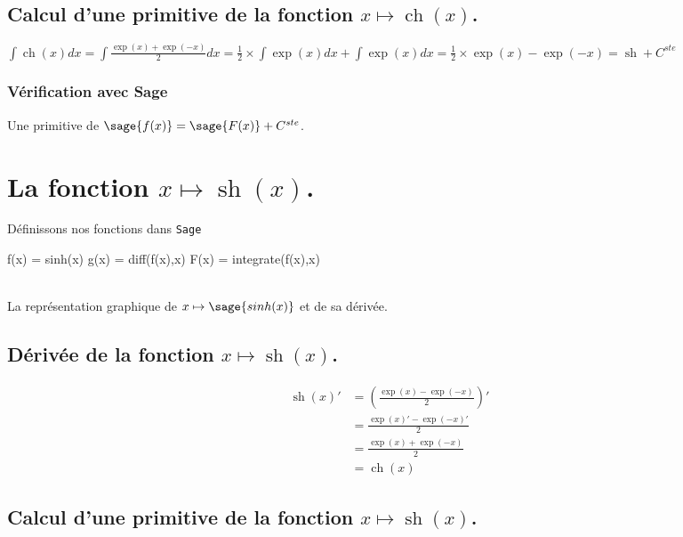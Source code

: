 \documentclass[a4paper,landscape,17pt]{extreport} %
\renewcommand{\sinh}{\mathop{\mathrm{sh}}}
\renewcommand{\cosh}{\mathop{\mathrm{ch}}}
\begin{document}
\subsection{Calcul d'une primitive de la fonction  $x \mapsto \cosh(x)$.}

$\int \cosh(x) dx = \int \frac{\exp(x)+ \exp(-x)}{2} dx = \frac{1}{2} \times \int \exp(x) dx + \int \exp(x) dx = \frac{1}{2} \times \exp(x) - \exp(-x) = \sinh + C^{ste}$


\subsubsection{Vérification avec Sage}

Une primitive de $\sage{f(x)} = \sage{F(x)} + C^{ste}$.





\section{La fonction  $x \mapsto \sinh(x)$.}

Définissons nos fonctions dans {\texttt{Sage}}
\begin{sageblock}
    f(x) = sinh(x)
    g(x) = diff(f(x),x)
    F(x) = integrate(f(x),x)
\end{sageblock}



\begin{center}
 \\
La représentation graphique de $x \mapsto \sage{sinh(x)} $ et de sa dérivée. 
\end{center}


\subsection{Dérivée de la fonction $x \mapsto \sinh(x)$.}

\begin{align*}
\sinh(x)' & = \left( \frac{\exp(x)-\exp(-x)}{2} \right)' \\ 
& = \frac{\exp(x)'-\exp(-x)'}{2} \\
& = \frac{\exp(x)+\exp(-x)}{2} \\
& = \cosh(x)
\end{align*}


\subsection{Calcul d'une primitive de la fonction  $x \mapsto \sinh(x)$.}
\end{document}
